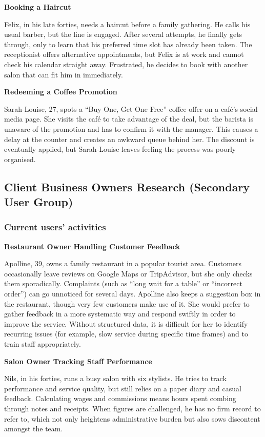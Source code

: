 \documentclass[]{VUMIFTemplateClass}
\begin{document}
\newpage

\textbf{Booking a Haircut}

Felix, in his late forties, needs a haircut before a family gathering. He calls his usual barber, but the line is engaged. After several attempts, he finally gets through, only to learn that his preferred time slot has already been taken. The receptionist offers alternative appointments, but Felix is at work and cannot check his calendar straight away. Frustrated, he decides to book with another salon that can fit him in immediately.

\textbf{Redeeming a Coffee Promotion}

Sarah‑Louise, 27, spots a “Buy One, Get One Free” coffee offer on a café’s social media page. She visits the café to take advantage of the deal, but the barista is unaware of the promotion and has to confirm it with the manager. This causes a delay at the counter and creates an awkward queue behind her. The discount is eventually applied, but Sarah‑Louise leaves feeling the process was poorly organised.

\subsection{Client Business Owners Research (Secondary User Group)}

\subsubsection{Current users' activities}

\textbf{Restaurant Owner Handling Customer Feedback}

Apolline, 39, owns a family restaurant in a popular tourist area. Customers occasionally leave reviews on Google Maps or TripAdvisor, but she only checks them sporadically. Complaints (such as “long wait for a table” or “incorrect order”) can go unnoticed for several days. Apolline also keeps a suggestion box in the restaurant, though very few customers make use of it. She would prefer to gather feedback in a more systematic way and respond swiftly in order to improve the service. Without structured data, it is difficult for her to identify recurring issues (for example, slow service during specific time frames) and to train staff appropriately.

\textbf{Salon Owner Tracking Staff Performance}

Nils, in his forties, runs a busy salon with six stylists. He tries to track performance and service quality, but still relies on a paper diary and casual feedback. Calculating wages and commissions means hours spent combing through notes and receipts. When figures are challenged, he has no firm record to refer to, which not only heightens administrative burden but also sows discontent amongst the team.
\end{document}
